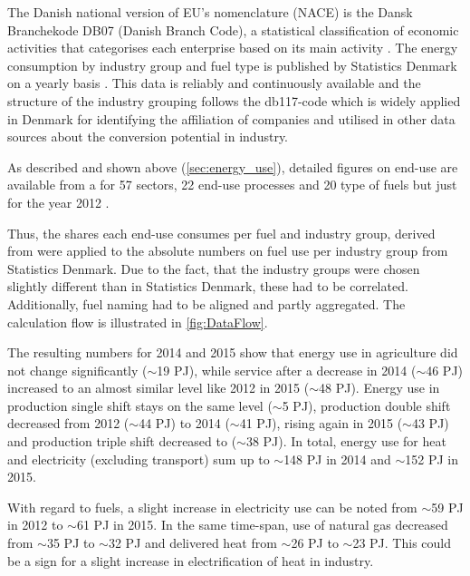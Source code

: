 \documentclass[review]{elsarticle}
\begin{document}
The Danish national version of EU's nomenclature (NACE) is the Dansk Branchekode DB07 (Danish Branch Code), a statistical classification of economic activities that categorises each enterprise based on its main activity \cite{DanmarksStatistik2013}. The energy consumption by industry group and fuel type is published by Statistics Denmark on a yearly basis \cite{StatisticsDenmark2017}. This data is reliably and continuously available and the structure of the industry grouping follows the db117-code which is widely applied in Denmark for identifying the affiliation of companies and utilised in other data sources about the conversion potential in industry.

As described and shown above (\autoref{sec:energy_use}), detailed figures on end-use are available from a \cite{VM2015} for 57 sectors, 22 end-use processes and 20 type of fuels but just for the year 2012 .

Thus, the shares each end-use consumes per fuel and industry group, derived from \cite{VM2015} were applied to the absolute numbers on fuel use per industry group from Statistics Denmark. Due to the fact, that the industry groups were chosen slightly different than in Statistics Denmark, these had to be correlated. Additionally, fuel naming had to be aligned and partly aggregated. The calculation flow is illustrated in \autoref{fig:DataFlow}.

The resulting numbers for 2014 and 2015 show that energy use in agriculture did not change significantly ($\sim$19 PJ), while service after a decrease in 2014 ($\sim$46 PJ) increased to an almost similar level like 2012 in 2015 ($\sim$48 PJ). Energy use in production single shift stays on the same level ($\sim$5 PJ), production double shift decreased from 2012 ($\sim$44 PJ) to 2014 ($\sim$41 PJ), rising again in 2015 ($\sim$43 PJ) and production triple shift decreased to ($\sim$38 PJ). In total, energy use for heat and electricity (excluding transport) sum up to $\sim$148 PJ in 2014 and $\sim$152 PJ in 2015.

With regard to fuels, a slight increase in electricity use can be noted from $\sim$59 PJ in 2012 to $\sim$61 PJ in 2015. In the same time-span, use of natural gas decreased from $\sim$35 PJ to $\sim$32 PJ and delivered heat from $\sim$26 PJ to $\sim$23 PJ. This could be a sign for a slight increase in electrification of heat in industry.

\end{document}
